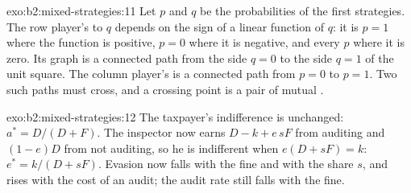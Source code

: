 \begin{solution}{exo:b2:mixed-strategies:11}
Let $p$ and $q$ be the probabilities of the first strategies. The row player's  to $q$ depends on the
sign of a linear function of $q$: it is $p = 1$ where the function is positive, $p = 0$ where it is negative, and
every $p$ where it is zero. Its graph is a connected path from the side $q = 0$ to the side $q = 1$ of the unit
square. The column player's is a connected path from $p = 0$ to $p = 1$. Two such paths must cross, and a crossing
point is a pair of mutual .
\end{solution}

\begin{solution}{exo:b2:mixed-strategies:12}
The taxpayer's indifference is unchanged: $a^* = D/(D + F)$. The inspector now earns $D - k + e\,sF$ from auditing and
$(1 - e)D$ from not auditing, so he is indifferent when $e(D + sF) = k$: $e^* = k/(D + sF)$. Evasion now falls with the
fine and with the share $s$, and rises with the cost of an audit; the audit rate still falls with the fine.
\end{solution}


